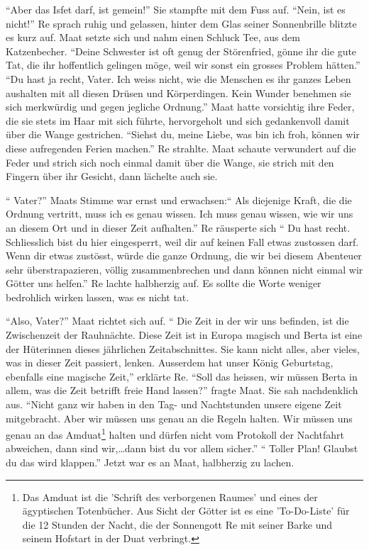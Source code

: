 \documentclass[11pt,titlepage,a5paper]{book}
\begin{document}
 "`Aber das Isfet darf, ist gemein!"' Sie stampfte mit dem Fuss auf. "`Nein, ist es nicht!"' Re sprach ruhig und gelassen, hinter dem Glas seiner Sonnenbrille blitzte es kurz auf. Maat setzte sich und nahm einen Schluck Tee, aus dem Katzenbecher. "`Deine Schwester ist oft genug der Störenfried, gönne ihr die gute Tat, die ihr hoffentlich gelingen möge, weil wir sonst ein grosses Problem hätten."' "`Du hast ja recht, Vater. Ich weiss nicht, wie die Menschen es ihr ganzes Leben aushalten mit all diesen Drüsen und Körperdingen. Kein Wunder benehmen sie sich merkwürdig und gegen jegliche Ordnung."' Maat hatte vorsichtig ihre Feder, die sie stets im Haar mit sich führte, hervorgeholt und sich gedankenvoll damit über die Wange gestrichen. "`Siehst du, meine Liebe, was bin ich froh, können wir diese aufregenden Ferien machen."' Re strahlte. Maat schaute verwundert auf die Feder und strich sich noch einmal damit über die Wange, sie strich mit den Fingern über ihr Gesicht, dann lächelte auch sie.
 
"` Vater?"' Maats Stimme war ernst und erwachsen:"` Als diejenige Kraft, die die Ordnung vertritt, muss ich es genau wissen. Ich muss genau wissen, wie wir uns an diesem Ort und in dieser Zeit aufhalten."' Re räusperte sich "` Du hast recht. Schliesslich bist du hier eingesperrt, weil dir auf keinen Fall etwas zustossen darf. Wenn dir etwas zustösst, würde die ganze Ordnung, die wir bei diesem Abenteuer sehr überstrapazieren, völlig zusammenbrechen und dann können nicht einmal wir Götter uns helfen."' Re lachte halbherzig auf. Es sollte die Worte weniger bedrohlich wirken lassen, was es nicht tat.

 "`Also, Vater?"' Maat richtet sich auf. "` Die Zeit in der wir uns befinden, ist die Zwischenzeit der Rauhnächte. Diese Zeit ist in Europa magisch und Berta ist eine der Hüterinnen dieses jährlichen Zeitabschnittes. Sie kann nicht alles, aber vieles, was in dieser Zeit passiert, lenken. Ausserdem hat unser König Geburtstag, ebenfalls eine magische Zeit,"' erklärte Re. "`Soll das heissen, wir müssen Berta in allem, was die Zeit betrifft freie Hand lassen?"' fragte Maat. Sie sah nachdenklich aus. "`Nicht ganz wir haben in den Tag- und Nachtstunden unsere eigene Zeit mitgebracht. Aber wir müssen uns genau an die Regeln halten. Wir müssen uns genau an das Amduat\footnote{Das Amduat ist die 'Schrift des verborgenen Raumes' und eines der ägyptischen Totenbücher. Aus Sicht der Götter ist es eine 'To-Do-Liste' für die 12 Stunden der Nacht, die der Sonnengott Re mit seiner Barke und seinem Hofstart in der Duat verbringt.} halten und dürfen nicht vom Protokoll der Nachtfahrt abweichen, dann sind wir,\dots dann bist du vor allem sicher."' "` Toller Plan! Glaubst du das wird klappen."' Jetzt war es an Maat, halbherzig zu lachen.
 
\end{document}

